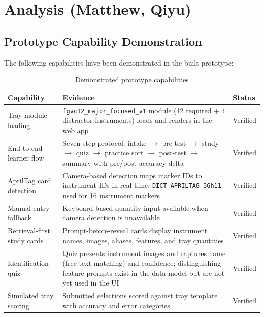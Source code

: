 \documentclass[10pt,a4paper]{article}
\begin{document}

\section{Analysis \hfill {\normalfont\small (Matthew, Qiyu)}}
\label{sec:analysis}



\subsection{Prototype Capability Demonstration}
\label{sec:prototype-capability-demonstration}

The following capabilities have been demonstrated in the built prototype:

\begin{table}[H]
\centering
\caption{Demonstrated prototype capabilities}
\label{tab:demonstrated-prototype-capabilities}
\small\renewcommand{\arraystretch}{1.2}\setlength{\tabcolsep}{4pt}
\begin{tabularx}{\textwidth}{|>{\raggedright\arraybackslash}X|>{\raggedright\arraybackslash}X|>{\raggedright\arraybackslash}X|}
\hline
Capability & Evidence & Status \\
\hline
Tray module loading & \texttt{fgvc12\_major\_focused\_v1} module (12 required + 4 distractor instruments) loads and renders in the web app & Verified \\
\hline
End-to-end learner flow & Seven-step protocol: intake $\to$ pre-test $\to$ study $\to$ quiz $\to$ practice sort $\to$ post-test $\to$ summary with pre/post accuracy delta & Verified \\
\hline
AprilTag card detection & Camera-based detection maps marker IDs to instrument IDs in real time; \texttt{DICT\_APRILTAG\_36h11} used for 16 instrument markers & Verified \\
\hline
Manual entry fallback & Keyboard-based quantity input available when camera detection is unavailable & Verified \\
\hline
Retrieval-first study cards & Prompt-before-reveal cards display instrument names, images, aliases, features, and tray quantities & Verified \\
\hline
Identification quiz & Quiz presents instrument images and captures name (free-text matching) and confidence; distinguishing-feature prompts exist in the data model but are not yet used in the UI & Verified \\
\hline
Simulated tray scoring & Submitted selections scored against tray template with accuracy and error categories & Verified \\

\end{tabularx}
\end{table}
\end{document}
